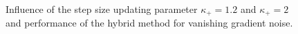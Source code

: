 \vspace{-1.5em}

\begin{figure}[H]
	\begin{subfigure}{0.49\textwidth}
	\end{subfigure}
	\begin{subfigure}{0.49\textwidth}
	\end{subfigure}
	\caption{Influence of the step size updating parameter \(\kappa_+ = 1.2\) and \(\kappa_+ =2 \) and performance of the hybrid method for vanishing gradient noise.}%
	\label{fig_van_grad_noise_comp_large}%
\end{figure}

